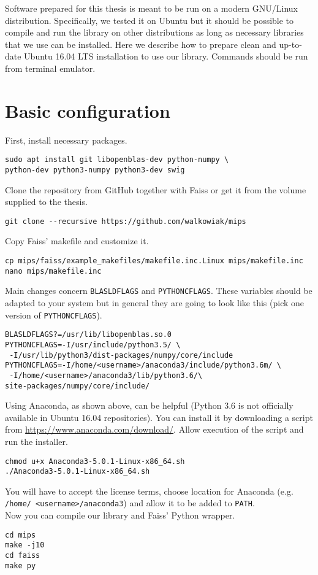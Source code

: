 Software prepared for this thesis is meant to be run on a modern GNU/Linux distribution.
Specifically, we tested it on Ubuntu but it should be possible to compile and run the library on other distributions as long as necessary libraries that we use can be installed.
Here we describe how to prepare clean and up-to-date Ubuntu 16.04 LTS installation to use our library.
Commands should be run from terminal emulator.
\section{Basic configuration}
\noindent
First, install necessary packages.
\begin{verbatim}
sudo apt install git libopenblas-dev python-numpy \
python-dev python3-numpy python3-dev swig
\end{verbatim}
Clone the repository from GitHub together with Faiss or get it from the volume supplied to the thesis.
\begin{verbatim}
git clone --recursive https://github.com/walkowiak/mips
\end{verbatim}
Copy Faiss' makefile and customize it.
\begin{verbatim}
cp mips/faiss/example_makefiles/makefile.inc.Linux mips/makefile.inc
nano mips/makefile.inc
\end{verbatim}
Main changes concern \texttt{BLASLDFLAGS} and \texttt{PYTHONCFLAGS}.
These variables should be adapted to your system but in general they are going to look like this (pick one version of \texttt{PYTHONCFLAGS}).
\begin{verbatim}
BLASLDFLAGS?=/usr/lib/libopenblas.so.0
PYTHONCFLAGS=-I/usr/include/python3.5/ \
 -I/usr/lib/python3/dist-packages/numpy/core/include
PYTHONCFLAGS=-I/home/<username>/anaconda3/include/python3.6m/ \
 -I/home/<username>/anaconda3/lib/python3.6/\
site-packages/numpy/core/include/
\end{verbatim}
Using Anaconda, as shown above, can be helpful (Python 3.6 is not officially available in Ubuntu 16.04 repositories). You can install it by downloading a script from \url{https://www.anaconda.com/download/}.
Allow execution of the script and run the installer.
\begin{verbatim}
chmod u+x Anaconda3-5.0.1-Linux-x86_64.sh
./Anaconda3-5.0.1-Linux-x86_64.sh
\end{verbatim}
You will have to accept the license terms, choose location for Anaconda (e.g. \texttt{/home/ <username>/anaconda3}) and allow it to be added to \texttt{PATH}.\\
Now you can compile our library and Faiss' Python wrapper.
\begin{verbatim}
cd mips
make -j10
cd faiss
make py
\end{verbatim}

